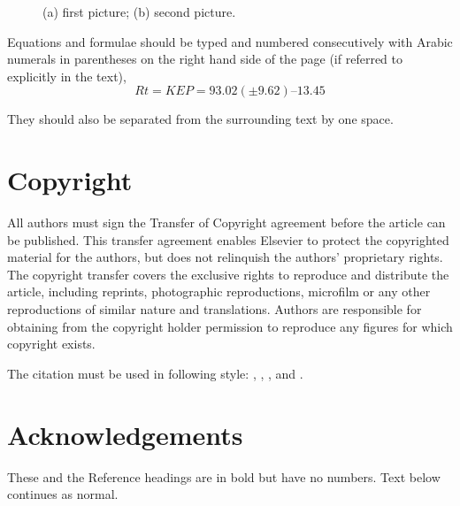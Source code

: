 \documentclass[3p,times,procedia]{elsarticle}
\begin{document}
\begin{figure}[h]
\caption{(a) first picture; (b) second picture.}
\end{figure}


Equations and formulae should be typed and numbered consecutively with Arabic numerals in parentheses on the right hand side of the page (if referred to explicitly in the text),
\begin{equation}
Rt = K EP = 93.02 (\pm 9.62) – 13.45
\end{equation}

They should also be separated from the surrounding text by one space.

\section{Copyright}
All authors must sign the Transfer of Copyright agreement before the article can be published. This transfer agreement enables Elsevier to protect the copyrighted material for the authors, but does not relinquish the authors' proprietary rights. The copyright transfer covers the exclusive rights to reproduce and distribute the article, including reprints, photographic reproductions, microfilm or any other reproductions of similar nature and translations. Authors are responsible for obtaining from the copyright holder permission to reproduce any figures for which copyright exists.


The citation must be used in following style: \cite{article-minimal}, \cite{article-full}, \cite{article-crossref}, \cite{whole-journal} and \cite{inbook-minimal}.

\section*{Acknowledgements}

These and the Reference headings are in bold but have no numbers. Text below continues as normal. 







\end{document}
